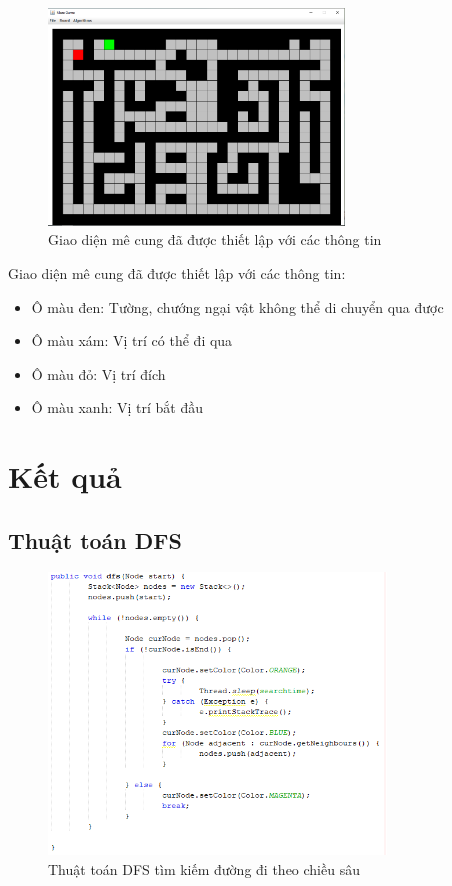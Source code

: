 \begin{figure}[h!]
	\centering
	\includegraphics[width=0.7\textwidth]{
		Figures/figs/5.PNG
	}
	\caption[Giao diện mê cung đã được thiết lập với các thông tin]{
		Giao diện mê cung đã được thiết lập với các thông tin	 
	}
	\label{fig:hinhi}
\end{figure}

Giao diện mê cung đã được thiết lập với các thông tin:
\begin{itemize}
	\item Ô màu đen: Tường, chướng ngại vật không thể di chuyển qua được
	\item Ô màu xám: Vị trí có thể đi qua
	\item Ô màu đỏ: Vị trí đích
	\item Ô màu xanh: Vị trí bắt đầu
\end{itemize}

\newpage
\section{Kết quả}
\subsection{Thuật toán DFS}
\begin{figure}[h!]
	\centering
	\includegraphics[width=0.8\textwidth]{
		Figures/figs/8.PNG
	}
	\caption[Thuật toán DFS tìm kiếm đường đi theo chiều sâu]{
		Thuật toán DFS tìm kiếm đường đi theo chiều sâu
	}
	\label{fig:hinhK}
\end{figure}

